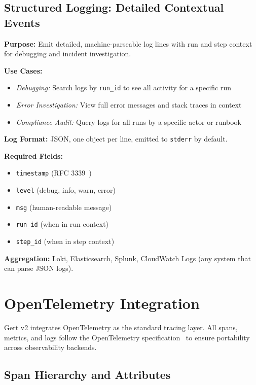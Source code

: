 \subsection{Structured Logging: Detailed Contextual Events}

\textbf{Purpose:} Emit detailed, machine-parseable log lines with run and step context for debugging and incident investigation.

\textbf{Use Cases:}
\begin{itemize}
  \item \textit{Debugging:} Search logs by \texttt{run\_id} to see all activity for a specific run
  \item \textit{Error Investigation:} View full error messages and stack traces in context
  \item \textit{Compliance Audit:} Query logs for all runs by a specific actor or runbook
\end{itemize}

\textbf{Log Format:} JSON, one object per line, emitted to \texttt{stderr} by default.

\textbf{Required Fields:}
\begin{itemize}
  \item \texttt{timestamp} (RFC 3339~\cite{rfc3339})
  \item \texttt{level} (debug, info, warn, error)
  \item \texttt{msg} (human-readable message)
  \item \texttt{run\_id} (when in run context)
  \item \texttt{step\_id} (when in step context)
\end{itemize}

\textbf{Aggregation:} Loki, Elasticsearch, Splunk, CloudWatch Logs (any system that can parse JSON logs).

\section{OpenTelemetry Integration}

Gert v2 integrates OpenTelemetry as the standard tracing layer. All spans, metrics, and logs follow the OpenTelemetry specification~\cite{otel-spec} to ensure portability across observability backends.

\subsection{Span Hierarchy and Attributes}

